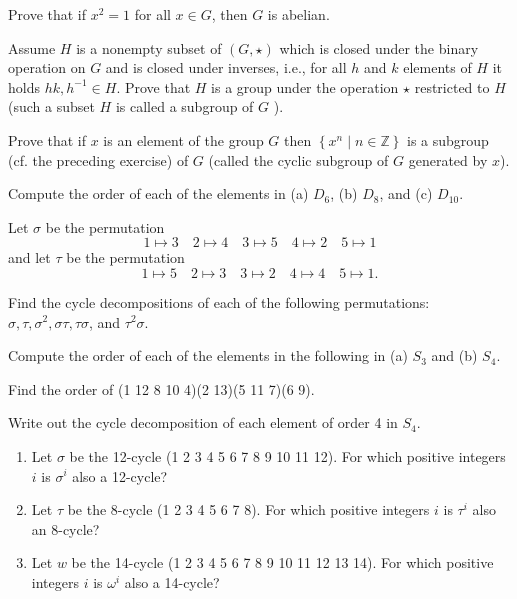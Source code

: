 \begin{questions}
\question
 Prove that if \(x^2=1\) for all \(x \in G\), then \(G\) is abelian.

\question
Assume \({H}\) is a nonempty subset of \((G, \star)\) which is closed under the binary operation on \(G\) and is closed under inverses, i.e., for all \(h\) and \(k\) elements of \(H\) it holds    \(hk,h^{-1} \in H\). Prove that \(H\) is a group under the operation \(\star\) restricted to \(H\) (such a subset \(H\) is called a subgroup of \(G\) ).

\question
Prove that if \(x\) is an element of the group \(G\) then \(\left\{x^n \mid n \in \mathbb{Z}\right\}\) is a subgroup (cf. the preceding exercise) of \(G\) (called the cyclic subgroup of \(G\) generated by \(x\)).

\question
Compute the order of each of the elements in  (a) \(D_6\), (b) \(D_8\), and (c) \(D_{10}\).



\question
Let \(\sigma\) be the permutation
\[
1 \mapsto 3 \quad 2 \mapsto 4 \quad 3 \mapsto 5 \quad 4 \mapsto 2 \quad 5 \mapsto 1
\]
and let \(\tau\) be the permutation
\[
1 \mapsto 5 \quad 2 \mapsto 3 \quad 3 \mapsto 2 \quad 4 \mapsto 4 \quad 5 \mapsto 1 .
\]

Find the cycle decompositions of each of the following permutations: \(\sigma, \tau, \sigma^2, \sigma \tau, \tau \sigma\), and \(\tau^2 \sigma\).




\question

Compute the order of each of the elements in the following in (a) \(S_3\) and (b) \(S_4\).

\question
Find the order of (1 12 8 10 4)(2 13)(5 11 7)(6 9).


\question
Write out the cycle decomposition of each element of order 4 in \(S_4\).


\question
\begin{enumerate}[label=(\alph*)]
    \item Let \(\sigma\) be the 12-cycle (1 2 3 4 5 6 7 8 9 10 11 12). For which positive integers \(i\) is \(\sigma^i\) also a 12-cycle?
    \item Let \(\tau\) be the 8-cycle (1 2 3 4 5 6 7 8). For which positive integers \(i\) is \(\tau^i\) also an 8-cycle?
    \item Let \(w\) be the 14-cycle (1 2 3 4 5 6 7 8 9 10 11 12 13 14). For which positive integers \(i\) is \(\omega^i\) also a 14-cycle?
\end{enumerate}


\end{questions}
